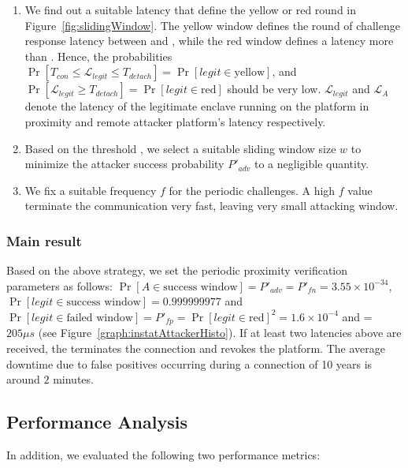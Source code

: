 \begin{enumerate}
  \item We find out a suitable latency \detach that define the yellow or red round in Figure~\ref{fig:slidingWindow}. The yellow window defines the round of challenge response latency between \connect and \detach, while the red window defines a latency more than \detach. Hence, the probabilities $\Pr[T_{con}\leq \mathcal{L}_{legit}\leq T_{detach}]=\Pr[legit\in\text{yellow}]$, and $\Pr[\mathcal{L}_{legit} \geq T_{detach}]=\Pr[legit\in\text{red}]$ should be very low. $\mathcal{L}_{legit}$ and $\mathcal{L}_{A}$ denote the latency of the legitimate enclave running on the platform in proximity and remote attacker platform's latency respectively.
  \item Based on the threshold \detach, we select a suitable sliding window size $w$ to minimize the attacker success probability $P'_{adv}$ to a negligible quantity.
  \item We fix a suitable frequency $f$ for the periodic challenges. A high $f$ value terminate the communication very fast, leaving very small attacking window.
\end{enumerate}


\subsubsection{Main result} Based on the above strategy, we set the periodic proximity verification parameters as follows: $\Pr[A \in \text{success window}]=P'_{adv} = P'_{fn}= 3.55\times 10^{-34}$, $\Pr[legit \in \text{success window}]=0.999999977$ and $\Pr[legit \in \text{failed window}]=P'_{fp}=\Pr[legit\in\text{red}]^2=1.6\times10^{-4}$ and \detach = $205 \mu s$ (see Figure~\ref{graph:instatAttackerHisto}). If at least two latencies above \detach are received, the \device terminates the connection and revokes the platform. The average downtime due to false positives occurring during a connection of 10 years is around $2$ minutes. 



\subsection{Performance Analysis}

In addition, we evaluated the following two performance metrics:


